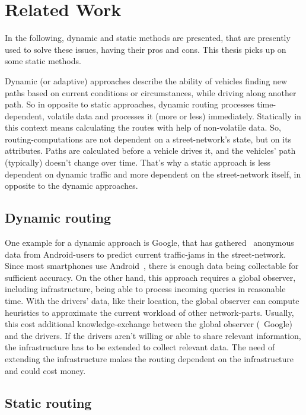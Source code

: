 \section{Related Work}

    In the following, dynamic and static methods are presented, that are presently used to solve these issues, having their pros and cons.
    This thesis picks up on some static methods.

    Dynamic (or adaptive) approaches describe the ability of vehicles finding new paths based on current conditions or circumstances, while driving along another path.
    So in opposite to static approaches, dynamic routing processes time-dependent, volatile data and processes it (more or less) immediately.
    Statically in this context means calculating the routes with help of non-volatile data.
    So, routing-computations are not dependent on a street-network's state, but on its attributes.
    Paths are calculated before a vehicle drives it, and the vehicles' path (typically) doesn't change over time.
    That's why a static approach is less dependent on dynamic traffic and more dependent on the street-network itself, in opposite to the dynamic approaches.

    \subsection{Dynamic routing}

        One example for a dynamic approach is Google, that has gathered~\cite{barth:google-traffic} anonymous data from Android-users to predict current traffic-jams in the street-network.
        Since most smartphones use Android~\cite{kantar:android-vs-ios}, there is enough data being collectable for sufficient accuracy.
        On the other hand, this approach requires a global observer, including infrastructure, being able to process incoming queries in reasonable time.
        With the drivers' data, like their location, the global observer can compute heuristics to approximate the current workload of other network-parts.
        Usually, this cost additional knowledge-exchange between the global observer (\eg\ Google) and the drivers.
        If the drivers aren't willing or able to share relevant information, the infrastructure has to be extended to collect relevant data.
        The need of extending the infrastructure makes the routing dependent on the infrastructure and could cost money.

    \subsection{Static routing}

